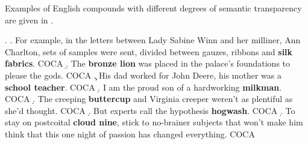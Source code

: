 Examples of English
compounds with different degrees of semantic trans\-par\-en\-cy are given in \Next.

\ex. %
\a. \label{ex:silk_fabrics}
For example, in the letters between Lady Sabine Winn and her mil\-li\-ner, Ann Charlton, sets of samples were sent, divided between gauzes, ribbons and \textbf{silk fabrics}. COCA
\b.  \label{ex:bronze_lion}%
 The \textbf{bronze lion} was placed in the palace's foundations to please the
 gods. COCA
\c. \label{ex:school_teacher} %
His dad worked for John Deere, his mother was a \textbf{school teacher}. COCA
\d. \label{ex:milk_man} %
 I am the proud son of a hardworking \textbf{milkman}. COCA
\d. \label{ex:butter_cup} %
 The creeping \textbf{buttercup} and Virginia creeper weren't as plentiful as
 she'd thought. COCA
 \d. \label{ex:hog_wash} %
But experts call the hypothesis \textbf{hogwash}. COCA
\d. \label{ex:cloud_nine}%
To stay on postcoital \textbf{cloud nine}, stick to no-brainer subjects that
won't make him think that this one night of passion has changed
everything. COCA

